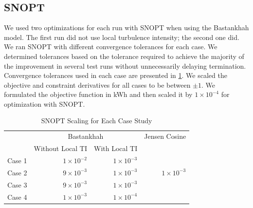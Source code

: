 \documentclass[hidelinks,sort&compress,AMA,STIX1COL]{WileyNJD-v2}
\begin{document}
\subsection{SNOPT}
We used two optimizations for each run with SNOPT when using the Bastankhah model. The first run did not use local turbulence intensity; the second one did. We ran SNOPT with different convergence tolerances for each case. We determined tolerances based on the tolerance required to achieve the majority of the improvement in several test runs without unnecessarily delaying termination. Convergence tolerances used in each case are presented in \cref{tab:snopttols}. We scaled the objective and constraint derivatives for all cases to be between $\pm1$. We formulated the objective function in kWh and then scaled it by $1\times10^{-4}$ for optimization with SNOPT.
%
\begin{table}[h!]
	\centering
	\caption{SNOPT Scaling for Each Case Study}
	\label{tab:snopttols}
	\begin{tabular}{lrrr}
		\toprule
		{} & \multicolumn{2}{c}{Bastankhah } & Jensen Cosine \\
		\cmidrule(lr){2-3} \cmidrule(lr){4-4}
		 & Without Local TI & With Local TI &  \\
		\cmidrule(lr){2-3} 
		Case 1 &  $1\times10^{-2}$ & $1\times10^{-3}$ & \\
		Case 2 & $9\times10^{-3}$ & $1\times10^{-3}$ & $1\times10^{-3}$ \\
		Case 3 & $9\times10^{-3}$ & $1\times10^{-3}$ & \\
		Case 4 &  $1\times10^{-3}$ & $1\times10^{-4}$ &  \\
		\bottomrule
	\end{tabular}
\end{table}
\end{document}
